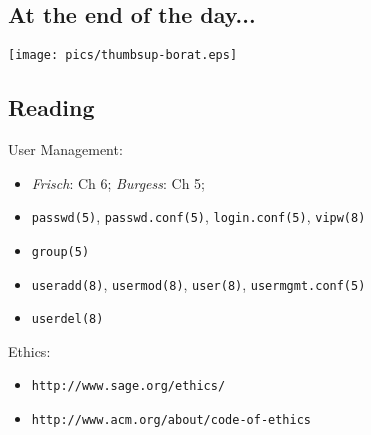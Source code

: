 \documentclass[xga]{xdvislides}
\begin{document}
%
%
%
%

\subsection{At the end of the day...}
\begin{center}
	\texttt{[image: pics/thumbsup-borat.eps]}
\end{center}

\subsection{Reading}
User Management:
\begin{itemize}
	\item {\em Frisch}: Ch 6; {\em Burgess}: Ch 5;
	\item \verb+passwd(5)+, \verb+passwd.conf(5)+, \verb+login.conf(5)+,
		\verb+vipw(8)+
	\item \verb+group(5)+
	\item \verb+useradd(8)+, \verb+usermod(8)+, \verb+user(8)+,
		\verb+usermgmt.conf(5)+
	\item \verb+userdel(8)+
\end{itemize}
Ethics:
\begin{itemize}
	\item \verb+http://www.sage.org/ethics/+
	\item \verb+http://www.acm.org/about/code-of-ethics+
\end{itemize}
\end{document}
